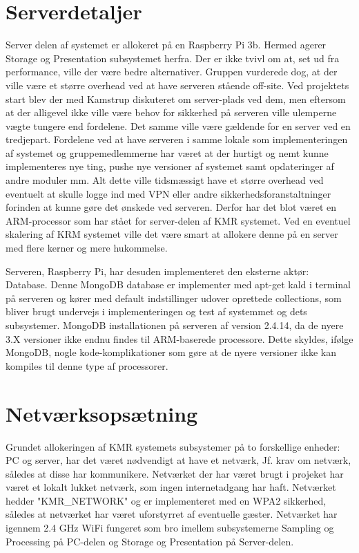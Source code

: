 \begin{appendices}
\section{Serverdetaljer}
Server delen af systemet er allokeret på en Raspberry Pi 3b. Hermed agerer Storage og Presentation subsystemet herfra. Der er ikke tvivl om at, set ud fra performance, ville der være bedre alternativer. Gruppen vurderede dog, at der ville være et større overhead ved at have serveren stående off-site. Ved projektets start blev der med Kamstrup diskuteret om server-plads ved dem, men eftersom at der alligevel ikke ville være behov for sikkerhed på serveren ville ulemperne vægte tungere end fordelene. Det samme ville være gældende for en server ved en tredjepart. Fordelene ved at have serveren i samme lokale som implementeringen af systemet og gruppemedlemmerne har været at der hurtigt og nemt kunne implementeres nye ting, pushe nye versioner af systemet samt opdateringer af andre moduler mm. Alt dette ville tidsmæssigt have et større overhead ved eventuelt at skulle logge ind med VPN eller andre sikkerhedsforanstaltninger forinden at kunne gøre det ønskede ved serveren. Derfor har det blot været en ARM-processor som har stået for server-delen af KMR systemet. Ved en eventuel skalering af KRM systemet ville det være smart at allokere denne på en server med flere kerner og mere hukommelse.

Serveren, Raspberry Pi, har desuden implementeret den eksterne aktør: Database. Denne MongoDB database er implementer med apt-get kald i terminal på serveren og kører med default indstillinger udover oprettede collections, som bliver brugt undervejs i implementeringen og test af systemmet og dets subsystemer.
MongoDB installationen på serveren af version 2.4.14, da de nyere 3.X versioner ikke endnu findes til ARM-baserede processore. Dette skyldes, ifølge MongoDB, nogle kode-komplikationer som gøre at de nyere versioner ikke kan kompiles til denne type af processorer.

\section{Netværksopsætning}
Grundet allokeringen af KMR systemets subsystemer på to forskellige enheder: PC og server, har det været nødvendigt at have et netværk, Jf. krav om netværk, således at disse har kommunikere. Netværket der har været brugt i projeket har været et lokalt lukket netværk, som ingen internetadgang har haft. Netværket hedder "KMR\_NETWORK" og er implementeret med en WPA2 sikkerhed, således at netværket har været uforstyrret af eventuelle gæster. Netværket har igennem 2.4 GHz WiFi fungeret som bro imellem subsystemerne Sampling og Processing på PC-delen og Storage og Presentation på Server-delen.


\end{appendices}
